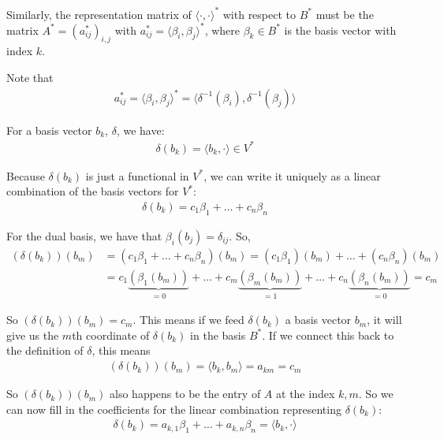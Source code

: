 \documentclass[12pt]{article}
\begin{document}
\begin{enumerate}[label=\alph*)]
    Similarly, the representation matrix of $\langle \cdot, \cdot \rangle^*$ with respect to $B^*$ must be the matrix $A^* = (a^*_{ij})_{i, j}$ with $a^*_{ij} = \langle \beta_i, \beta_j \rangle^*$, where $\beta_k \in B^*$ is the basis vector with index $k$.

    Note that
    \[
    \begin{aligned}
        a^*_{ij} = \langle \beta_i, \beta_j \rangle^* = \langle \delta^{-1}(\beta_i), \delta^{-1}(\beta_j) \rangle
    \end{aligned}
    \]

    For a basis vector $b_k$, $\delta$, we have:
    \[
    \begin{aligned}
        \delta(b_k) = \langle b_k, \cdot \rangle \in V^*
    \end{aligned}
    \]

    Because $\delta(b_k)$ is just a functional in $V^*$, we can write it uniquely as a linear combination of the basis vectors for $V^*$:
    \[
    \begin{aligned}
        \delta(b_k) = c_1\beta_1 + \dots + c_n \beta_n
    \end{aligned}
    \]

    For the dual basis, we have that $\beta_i(b_j) = \delta_{ij}$. So,
    \[
    \begin{aligned}
        (\delta(b_k))(b_m) &= (c_1\beta_1 + \dots + c_n \beta_n)(b_m) = (c_1\beta_1)(b_m) + \dots + (c_n \beta_n)(b_m) \\
        &= c_1\underbrace{(\beta_1(b_m))}_{= 0} + \dots +c_m \underbrace{(\beta_m(b_m))}_{= 1} + \dots + c_n \underbrace{(\beta_n(b_m))}_{= 0} = c_m
    \end{aligned}
    \]

    So $(\delta(b_k))(b_m) = c_m$. This means if we feed $\delta(b_k)$ a basis vector $b_m$, it will give us the $m$th coordinate of $\delta(b_k)$ in the basis $B^*$. If we connect this back to the definition of $\delta$, this means
    \[
    \begin{aligned}
        (\delta(b_k))(b_m) = \langle b_k, b_m \rangle = a_{km} = c_m 
    \end{aligned}
    \]

    So $(\delta(b_k))(b_m)$ also happens to be the entry of $A$ at the index $k, m$. So we can now fill in the coefficients for the linear combination representing $\delta(b_k)$:
    \[
    \begin{aligned}
        \delta(b_k) = a_{k, 1}\beta_1 + \dots + a_{k, n}\beta_n = \langle b_k, \cdot \rangle
    \end{aligned}
    \]


\end{enumerate}
\end{document}
